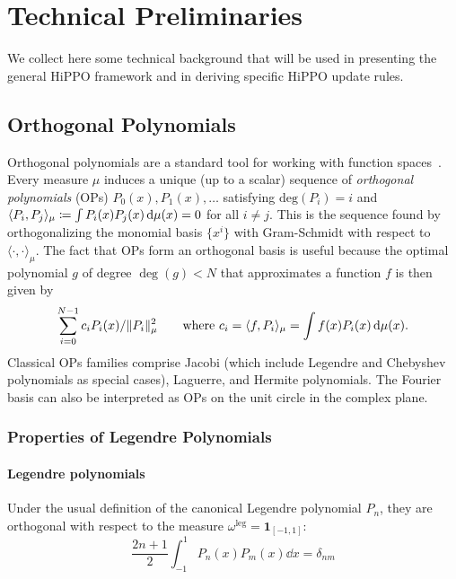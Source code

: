 \documentclass[../hippo.tex]{subfiles}
\begin{document}
\section{Technical Preliminaries}
\label{sec:background}

We collect here some technical background that will be used in presenting the
general HiPPO framework and in deriving specific HiPPO update rules.

\subsection{Orthogonal Polynomials}
\label{sec:op}
Orthogonal polynomials are a standard tool for working with function spaces~\cite{chihara,szego}.
Every measure $\mu$ induces a unique (up to a scalar) sequence of \emph{orthogonal polynomials} (OPs) $P_0(x), P_1(x), \dots$ satisfying $\mathrm{deg}(P_i) = i$ and
$ \langle P_i, P_j \rangle_{\mu} \coloneqq \int P_i(x) P_j(x) \mathop{}\!\mathrm{d} \mu(x) = 0 $ for all $i \neq j$.
This is the sequence found by orthogonalizing the monomial basis $\{x^i\}$ with Gram-Schmidt with respect to $\langle \cdot, \cdot \rangle_\mu$.
The fact that OPs form an orthogonal basis is useful because the optimal polynomial $g$ of degree $\deg(g) < N$
that approximates a function $f$ is then given by
\begin{align*}%
  \sum_{i=0}^{N-1} c_i P_i(x)/\|P_i\|_\mu^2 \qquad \text{where } c_i = \langle f, P_i \rangle_\mu = \int f(x) P_i(x) \d \mu(x).
\end{align*}
Classical OPs families comprise Jacobi (which include Legendre and Chebyshev
polynomials as special cases), Laguerre, and Hermite polynomials.
The Fourier basis can also be interpreted as OPs on the unit circle in the
complex plane.



\subsubsection{Properties of Legendre Polynomials}
\label{sec:legendre-properties}

\paragraph{Legendre polynomials}

Under the usual definition of the canonical Legendre polynomial $P_n$, they are
orthogonal with respect to the measure $\omega^{\mathrm{leg}} = \mathbf{1}_{[-1,1]}$:
\begin{equation}
  \label{eq:legendre}
  \frac{2n+1}{2} \int_{-1}^1 P_n(x)P_m(x) \dd x = \delta_{nm}
\end{equation}
\end{document}
